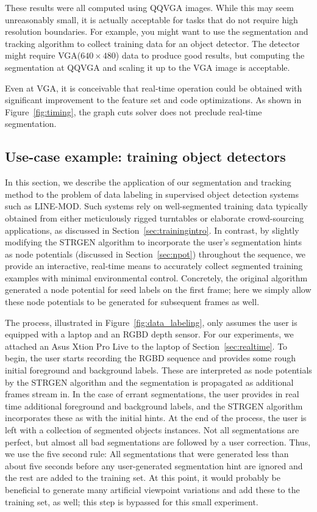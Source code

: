 \documentclass[journal]{IEEEtran}
\newcommand{\vga}{VGA\xspace}
\newcommand{\qqvga}{QQVGA\xspace}
\begin{document}
These results were all computed using \qqvga images.  While this may seem unreasonably small, it is actually acceptable for tasks that do not require high resolution boundaries.  For example, you might want to use the segmentation and tracking algorithm to collect training data for an object detector.  The detector might require \vga (\ie $640 \times 480$) data to produce good results, but computing the segmentation at \qqvga and scaling it up to the \vga image is acceptable.

Even at \vga, it is conceivable that real-time operation could be obtained with significant improvement to the feature set and code optimizations.  As shown in Figure~\ref{fig:timing}, the graph cuts solver does not preclude real-time segmentation.

\subsection{Use-case example: training object detectors}
\label{sec:example}

In this section, we describe the application of our segmentation and tracking method to the problem of data labeling in supervised object detection systems such as LINE-MOD. Such systems rely on well-segmented training data typically obtained from either meticulously rigged turntables or elaborate crowd-sourcing applications, as discussed in Section~\ref{sec:trainingintro}. In contrast, by slightly modifying the STRGEN algorithm to incorporate the user's segmentation hints as node potentials (discussed in Section~\ref{sec:npot}) throughout the sequence, we provide an interactive, real-time means to accurately collect segmented training examples with minimal environmental control.  Concretely, the original algorithm generated a node potential for seed labels on the first frame; here we simply allow these node potentials to be generated for subsequent frames as well.

The process, illustrated in Figure~\ref{fig:data_labeling}, only assumes the user is equipped with a laptop and an RGBD depth sensor.  For our experiments, we attached an Asus Xtion Pro Live to the laptop of Section~\ref{sec:realtime}. To begin, the user starts recording the RGBD sequence and provides some rough initial foreground and background labels. These are interpreted as node potentials by the STRGEN algorithm and the segmentation is propagated as additional frames stream in.  In the case of errant segmentations, the user provides in real time additional foreground and background labels, and the STRGEN algorithm incorporates these as with the initial hints.  At the end of the process, the user is left with a collection of segmented objects instances.  Not all segmentations are perfect, but almost all bad segmentations are followed by a user correction.  Thus, we use the five second rule: All segmentations that were generated less than about five seconds before any user-generated segmentation hint are ignored and the rest are added to the training set.  At this point, it would probably be beneficial to generate many artificial viewpoint variations and add these to the training set, as well; this step is bypassed for this small experiment.
\end{document}
